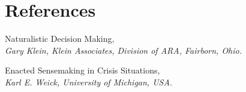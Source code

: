 \chapter{References}

\begin{thebibliography}{9}
	
	Naturalistic Decision Making, \\
	\emph{Gary Klein, Klein Associates, Division of ARA, Fairborn, Ohio.}
	
	Enacted Sensemaking in Crisis Situations, \\
	\emph{Karl E. Weick, University of Michigan, USA.}
	
\end{thebibliography}


\appendix



